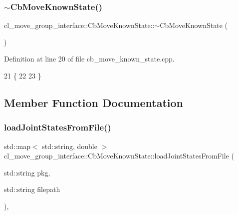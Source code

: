 \subsubsection{\texorpdfstring{$\sim$\+Cb\+Move\+Known\+State()}{~CbMoveKnownState()}}
{\footnotesize\ttfamily cl\+\_\+move\+\_\+group\+\_\+interface\+::\+Cb\+Move\+Known\+State\+::$\sim$\+Cb\+Move\+Known\+State (\begin{DoxyParamCaption}{ }\end{DoxyParamCaption})\hspace{0.3cm}{\ttfamily [virtual]}}



Definition at line 20 of file cb\+\_\+move\+\_\+known\+\_\+state.\+cpp.


\begin{DoxyCode}
21 \{
22   
23 \}
\end{DoxyCode}


\subsection{Member Function Documentation}
\mbox{\label{classcl__move__group__interface_1_1CbMoveKnownState_a3998d6e04560c6c4f36a3cb6f6a86780}} 
\subsubsection{\texorpdfstring{load\+Joint\+States\+From\+File()}{loadJointStatesFromFile()}}
{\footnotesize\ttfamily std\+::map$<$ std\+::string, double $>$ cl\+\_\+move\+\_\+group\+\_\+interface\+::\+Cb\+Move\+Known\+State\+::load\+Joint\+States\+From\+File (\begin{DoxyParamCaption}\item[{std\+::string}]{pkg,  }\item[{std\+::string}]{filepath }\end{DoxyParamCaption})\hspace{0.3cm}{\ttfamily [static]}, {\ttfamily [private]}}



